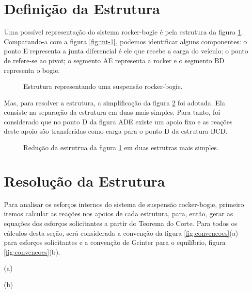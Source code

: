 \documentclass[12pt]{article}
\begin{document}
\pagebreak

\section{Definição da Estrutura}

Uma possível representação do sistema rocker-bogie é pela estrutura da figura \ref{fig:diagrama-base}. Comparando-a com a figura \ref{fig:int-1}, podemos identificar alguns componentes: o ponto E representa a junta diferencial é ele que recebe a carga do veículo; o ponto de refere-se ao pivot; o segmento AE representa a rocker e o segmento BD representa o bogie.

\begin{figure}[h!]
  \centering
  \resizebox{.6\textwidth}{!}{}
  \smallskip
  \caption{Estrutura representando uma suspensão rocker-bogie.}
  \label{fig:diagrama-base}
\end{figure}

Mas, para resolver a estrutura, a simplificação da figura \ref{fig:diagrama-simpl} foi adotada. Ela consiste na separação da estrutura em duas mais simples. Para tanto, foi considerado que no ponto D da figura ADE existe um apoio fixo e as reações deste apoio são transferidas como carga para o ponto D da estrutura BCD.

\begin{figure}[h!]
  \centering
  \resizebox{.7\textwidth}{!}{}
  \smallskip
  \caption{Redução da estrutrua da figura \ref{fig:diagrama-base} em duas estrutras mais simples.}
  \label{fig:diagrama-simpl}
\end{figure}

\pagebreak

\section{Resolução da Estrutura}

\begin{minipage}{.48\textwidth}
  Para analisar os esforços internos do sistema de suspensão rocker-bogie, primeiro iremos calcular as reações nos apoios de cada estrutura, para, então, gerar as equações dos esforços solicitantes a partir do Teorema do Corte. Para todos os cálculos desta seção, será considerada a convenção da figura \ref{fig:convencoes}(a) para esforços solicitantes e a convenção de Grinter para o equilíbrio, figura \ref{fig:convencoes}(b).
  \end{minipage}%
\hfill%
\begin{minipage}{.45\textwidth}
  \begin{minipage}{.7\textwidth}
    \centering
    \resizebox{\linewidth}{!}{}
    (a)
  \end{minipage}%
  \hfill%
  \begin{minipage}{.25\textwidth}
    \centering
    \resizebox{\linewidth}{!}{}
    (b)
  \end{minipage}
  \label{fig:convencoes}
\end{minipage}
\end{document}
